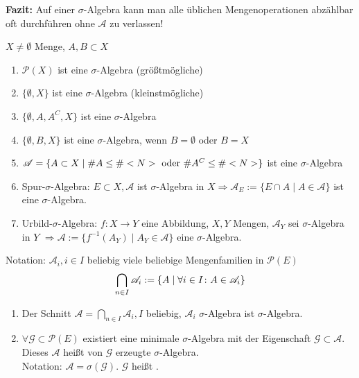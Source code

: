 \textbf{Fazit:} Auf einer $\sigma$-Algebra kann man alle üblichen Mengenoperationen abzählbar oft durchführen ohne $\mathscr{A}$ zu verlassen!

\begin{example}
	$X\neq\emptyset$ Menge, $A,B\subset X$
	\begin{enumerate}[label=(\alph*)]
		\item $\mathscr{P}(X)$ ist eine $\sigma$-Algebra (größtmögliche)
		\item $\{\emptyset,X\}$ ist eine $\sigma$-Algebra (kleinstmögliche)
		\item $\{\emptyset,A,A^C,X\}$ ist eine $\sigma$-Algebra
		\item $\{\emptyset,B,X\}$ ist eine $\sigma$-Algebra, wenn $B=\emptyset$ oder $B=X$
		\item $\mathscr{A}=\{A\subset X\mid \#A\le \#<N>\text{ oder } \#A^C\le \#<N>\}$ ist eine $\sigma$-Algebra %
		\item Spur-$\sigma$-Algebra: $E \subset X,\mathscr{A}$ ist $\sigma$-Algebra in $X \Rightarrow \mathscr{A}_E := \{E \cap A \mid A \in \mathscr{A}\}$ ist eine $\sigma$-Algebra.
		\item Urbild-$\sigma$-Algebra: $f: X \to Y$ eine Abbildung, $X,Y$ Mengen, $\mathscr{A}_Y$ sei $\sigma$-Algebra   in $Y$ $\Rightarrow \mathscr{A} := \{f^{-1}(A_Y)\mid A_Y \in \mathscr{A}\}$ eine $\sigma$-Algebra.
	\end{enumerate}
\end{example}

\begin{hint}
	Notation: $\mathscr{A}_i, i \in I$ beliebig viele beliebige Mengenfamilien in $\mathscr{P}(E)$
	\begin{align}
	\bigcap_{n\in I} \mathscr{A}_i := \{ A \mid \forall i \in I \colon A \in \mathscr{A}_i\}\notag
	\end{align}
\end{hint}

\begin{proposition}
	\begin{enumerate}[label=(\alph*)]
		\item Der Schnitt $\mathscr{A} = \bigcap_{n\in I} \mathscr{A}_i, I$ beliebig, $\mathscr{A}_i$ $\sigma$-Algebra ist $\sigma$-Algebra.
		\item $\forall \mathscr{G} \subset \mathscr{P}(E)$ existiert eine minimale $\sigma$-Algebra mit der Eigenschaft $\mathscr{G} \subset \mathscr{A}$. Dieses $\mathscr{A}$ heißt von $\mathscr{G}$ erzeugte $\sigma$-Algebra.\\
		Notation: $\mathscr{A} = \sigma(\mathscr{G})$.
		$\mathscr{G}$ heißt .
	\end{enumerate}
\end{proposition}



